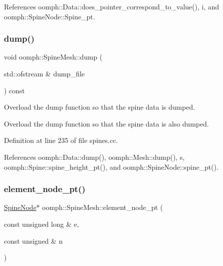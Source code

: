 References oomph\+::\+Data\+::does\+\_\+pointer\+\_\+correspond\+\_\+to\+\_\+value(), i, and oomph\+::\+Spine\+Node\+::\+Spine\+\_\+pt.

\mbox{\label{classoomph_1_1SpineMesh_a4181640b3ddff5d710397c8f3a51a494}} 
\subsubsection{\texorpdfstring{dump()}{dump()}}
{\footnotesize\ttfamily void oomph\+::\+Spine\+Mesh\+::dump (\begin{DoxyParamCaption}\item[{std\+::ofstream \&}]{dump\+\_\+file }\end{DoxyParamCaption}) const}



Overload the dump function so that the spine data is dumped. 

Overload the dump function so that the spine data is also dumped. 

Definition at line 235 of file spines.\+cc.



References oomph\+::\+Data\+::dump(), oomph\+::\+Mesh\+::dump(), s, oomph\+::\+Spine\+::spine\+\_\+height\+\_\+pt(), and oomph\+::\+Spine\+Node\+::spine\+\_\+pt().

\mbox{\label{classoomph_1_1SpineMesh_aea36e8d0454965f9f96a3adc4a5a9371}} 
\subsubsection{\texorpdfstring{element\+\_\+node\+\_\+pt()}{element\_node\_pt()}}
{\footnotesize\ttfamily \hyperlink{classoomph_1_1SpineNode}{Spine\+Node}$\ast$ oomph\+::\+Spine\+Mesh\+::element\+\_\+node\+\_\+pt (\begin{DoxyParamCaption}\item[{const unsigned long \&}]{e,  }\item[{const unsigned \&}]{n }\end{DoxyParamCaption})\hspace{0.3cm}{\ttfamily [inline]}}



